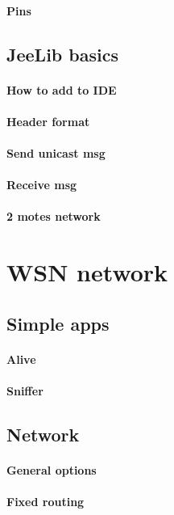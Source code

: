 \documentclass[12pt,titlepage]{article}
\begin{document}
		\paragraph{Pins}

	\subsection{JeeLib basics}
		\paragraph{How to add to IDE}
		\paragraph{Header format}
		\paragraph{Send unicast msg}
		\paragraph{Receive msg}
		\paragraph{2 motes network}

\section{WSN network}
	\subsection{Simple apps}
		\paragraph{Alive}
		\paragraph{Sniffer}

	\subsection{Network}
		\paragraph{General options}
		\paragraph{Fixed routing}
\end{document}
